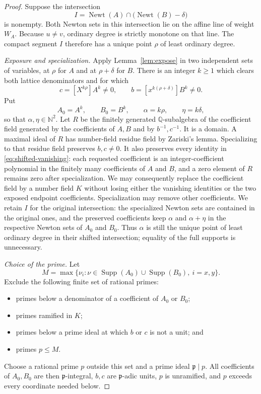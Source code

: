 \documentclass[11pt]{article}
\newcommand{\N}{\mathbb N}
\newcommand{\Q}{\mathbb Q}
\newcommand{\Newt}{\operatorname{Newt}}
\newcommand{\Supp}{\operatorname{Supp}}
\begin{document}
\begin{proof}
Suppose the intersection
\[
 I=\Newt(A)\cap\bigl(\Newt(B)-\delta\bigr)
\]
is nonempty.  Both Newton sets in this intersection lie on the affine line
of weight $W_A$.  Because $u\ne v$, ordinary degree is strictly monotone
on that line.  The compact segment $I$ therefore has a unique point
$\rho$ of least ordinary degree.

\emph{Exposure and specialization.}
Apply Lemma~\ref{lem:expose} in two independent sets of variables, at
$\rho$ for $A$ and at $\rho+\delta$ for $B$.  There is an integer $k\geq1$
which clears both lattice denominators and for which
\[
 c=[X^{k\rho}]A^k\ne0,
 \qquad b=[x^{k(\rho+\delta)}]B^k\ne0.
\]
Put
\[
 A_0=A^k,\qquad B_0=B^k,
 \qquad \alpha=k\rho,\qquad \eta=k\delta,
\]
so that $\alpha,\eta\in\N^2$.  Let $R$ be the finitely generated
$\Q$-subalgebra of the coefficient field generated by the coefficients of
$A,B$ and by $b^{-1},c^{-1}$.  It is a domain.  A maximal ideal of
$R$ has number-field residue field by Zariski's lemma.  Specializing to
that residue field preserves $b,c\ne0$.  It also preserves every identity
in \eqref{eq:shifted-vanishing}: each requested coefficient is an
integer-coefficient polynomial in the finitely many coefficients of $A$
and $B$, and a zero element of $R$ remains zero after specialization.
We may consequently replace the coefficient field by a number field $K$
without losing either the vanishing identities or the two exposed endpoint
coefficients.  Specialization may remove other coefficients.  We retain
$I$ for the original intersection: the specialized Newton sets are contained
in the original ones, and the preserved coefficients keep $\alpha$ and
$\alpha+\eta$ in the respective Newton sets of $A_0$ and $B_0$.
Thus $\alpha$ is still the unique point of least ordinary degree in
their shifted intersection; equality of the full supports is unnecessary.

\emph{Choice of the prime.}
Let
\[
 M=\max\{\nu_i:\nu\in\Supp(A_0)\cup\Supp(B_0),\ i=x,y\}.
\]
Exclude the following finite set of rational primes:
\begin{itemize}
 \item primes below a denominator of a coefficient of $A_0$ or $B_0$;
 \item primes ramified in $K$;
 \item primes below a prime ideal at which $b$ or $c$ is not a unit; and
 \item primes $p\leq M$.
\end{itemize}
Choose a rational prime $p$ outside this set and a prime ideal
$\mathfrak p\mid p$.  All coefficients of $A_0,B_0$ are then
$\mathfrak p$-integral, $b,c$ are $\mathfrak p$-adic units, $p$ is
unramified, and $p$ exceeds every coordinate needed below.


\end{proof}
\end{document}
